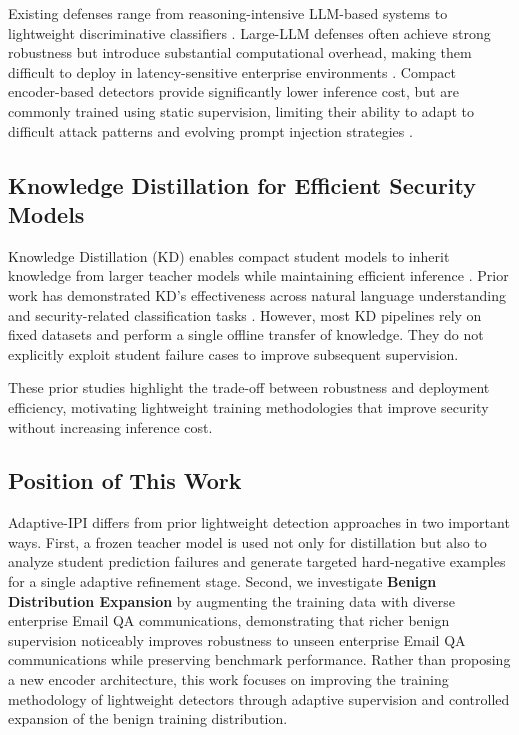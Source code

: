 \documentclass[conference]{IEEEtran}
\begin{document}
Existing defenses range from reasoning-intensive LLM-based systems to lightweight discriminative classifiers \cite{ref1, ref2}. Large-LLM defenses often achieve strong robustness but introduce substantial computational overhead, making them difficult to deploy in latency-sensitive enterprise environments \cite{ref4, ref6}. Compact encoder-based detectors provide significantly lower inference cost, but are commonly trained using static supervision, limiting their ability to adapt to difficult attack patterns and evolving prompt injection strategies \cite{ref5, ref7}.

\subsection{Knowledge Distillation for Efficient Security Models}

Knowledge Distillation (KD) enables compact student models to inherit knowledge from larger teacher models while maintaining efficient inference \cite{ref3}. Prior work has demonstrated KD's effectiveness across natural language understanding and security-related classification tasks \cite{ref3}. However, most KD pipelines rely on fixed datasets and perform a single offline transfer of knowledge. They do not explicitly exploit student failure cases to improve subsequent supervision.

These prior studies highlight the trade-off between robustness and deployment efficiency, motivating lightweight training methodologies that improve security without increasing inference cost.

\subsection{Position of This Work}

Adaptive-IPI differs from prior lightweight detection approaches in two important ways. First, a frozen teacher model is used not only for distillation but also to analyze student prediction failures and generate targeted hard-negative examples for a single adaptive refinement stage. Second, we investigate \textbf{Benign Distribution Expansion} by augmenting the training data with diverse enterprise Email QA communications, demonstrating that richer benign supervision noticeably improves robustness to unseen enterprise Email QA communications while preserving benchmark performance. Rather than proposing a new encoder architecture, this work focuses on improving the training methodology of lightweight detectors through adaptive supervision and controlled expansion of the benign training distribution.
\end{document}
